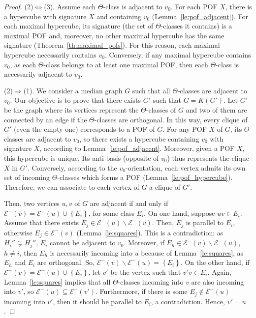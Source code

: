\documentclass{article}
\newcommand{\set}[1]{\left\{ #1 \right\}}
\begin{document}
\begin{proof}
(2)$\Leftrightarrow$(3). Assume each $\Theta$-class is adjacent to $v_0$. For each POF $X$, there is a hypercube with signature $X$ and containing $v_0$ (Lemma~\ref{le:pof_adjacent}). For each maximal hypercube, its signature (the set of $\Theta$-classes it contains) is a maximal POF and, moreover, no other maximal hypercube has the same signature (Theorem~\ref{th:maximal_pofs}). For this reason, each maximal hypercube necessarily contains $v_0$. 
Conversely, if any maximal hypercube contains $v_0$, as each $\Theta$-class belongs to at least one maximal POF, then each $\Theta$-class is necessarily adjacent to $v_0$.

(2)$\Rightarrow$(1). We consider a median graph $G$ such that all $\Theta$-classes are adjacent to $v_0$. Our objective is to prove that there exists $G'$ such that $G = K(G')$. Let $G'$ be the graph where its vertices represent the $\Theta$-classes of $G$ and two of them are connected by an edge if the $\Theta$-classes are orthogonal. In this way, every clique of $G'$ (even the empty one) corresponds to a POF of $G$. For any POF $X$ of $G$, its $\Theta$-classes are adjacent to $v_0$, so there exists a hypercube containing $v_0$ with signature $X$, according to Lemma~\ref{le:pof_adjacent}. Moreover, given a POF $X$, this hypercube is unique. Its anti-basis (opposite of $v_0$) thus represents the clique $X$ in $G'$. Conversely, according to the $v_0$-orientation, each vertex admits its own set of incoming $\Theta$-classes which forms a POF (Lemma~\ref{le:pof_hypercube}). Therefore, we can associate to each vertex of $G$ a clique of $G'$. 

Then, two vertices $u,v$ of $G$ are adjacent if and only if $\mathcal{E}^-(v) = \mathcal{E}^-(u) \cup \set{E_i}$, for some class $E_i$. On one hand, suppose $uv \in E_i$. Assume that there exists $E_j \in \mathcal{E}^-(u) \backslash \mathcal{E}^-(v)$. Then, $E_j$ is parallel to $E_i$, otherwise $E_j \in \mathcal{E}^-(v)$ (Lemma~\ref{le:squares}). This is a contradiction: as $H_i'' \subsetneq H_j''$, $E_i$ cannot be adjacent to $v_0$. Moreover, if $E_h \in \mathcal{E}^-(v) \backslash \mathcal{E}^-(u)$, $h \neq i$, then $E_h$ is necessarily incoming into $u$ because of Lemma~\ref{le:squares}, as $E_h$ and $E_i$ are orthogonal. So, $\mathcal{E}^-(v) \backslash \mathcal{E}^-(u) = \set{E_i}$. On the other hand, if $\mathcal{E}^-(v) = \mathcal{E}^-(u) \cup \set{E_i}$, let $v'$ be the vertex such that $v'v \in E_i$. Again, Lemma~\ref{le:squares} implies that all $\Theta$-classes incoming into $v$ are also incoming into $v'$, so $\mathcal{E}^-(u) \subseteq \mathcal{E}^-(v')$. Furthermore, if there is some $E_j \notin \mathcal{E}^-(u)$ incoming into $v'$, then it should be parallel to $E_i$, a contradiction. Hence, $v' = u$.


\end{proof}
\end{document}
